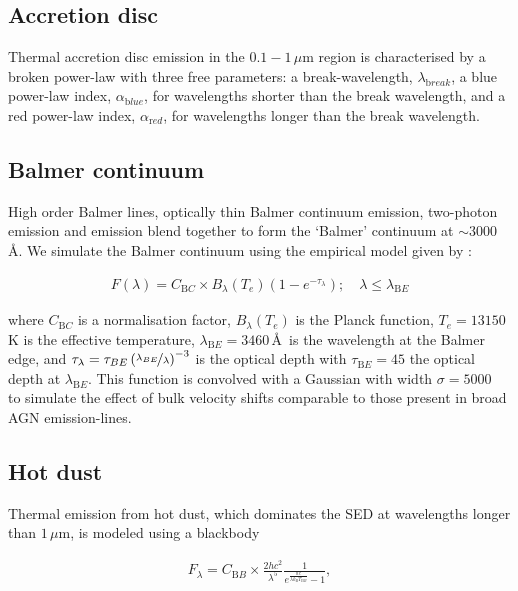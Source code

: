\subsection{Accretion disc}

Thermal accretion disc emission in the $0.1 - 1$\,$\mu$m region is characterised by a broken power-law with three free parameters: a break-wavelength, $\lambda_{\mathrm break}$, a blue power-law index, $\alpha_{\mathrm blue}$, for wavelengths shorter than the break wavelength, and a red power-law index, $\alpha_{\mathrm red}$, for wavelengths longer than the break wavelength.

\subsection{Balmer continuum}

High order Balmer lines, optically thin Balmer continuum emission, two-photon emission and  emission blend together to form the `Balmer' continuum at $\sim3000$\,\AA.
We simulate the Balmer continuum using the empirical model given by \citet{grandi82}: 

\begin{eqnarray}
  F(\lambda) = C_{\mathrm BC} \times B_\lambda(T_e)(1-e^{-\tau_\lambda}); \quad \lambda \leq \lambda_{\mathrm BE}
\end{eqnarray}

where $C_{\mathrm BC}$ is a normalisation factor, $B_\lambda(T_e)$ is the Planck function, $T_e=13150$\,K is the effective temperature, $\lambda_{\mathrm BE}=3460$\,\AA\, is the wavelength at the Balmer edge, and $\tau_\lambda = \tau_{BE}\left( \nicefrac{\lambda_{BE}} {\lambda} \right)^{-3}$ is the optical depth with $\tau_{\mathrm BE}=45$ the optical depth at $\lambda_{\mathrm BE}$. 
This function is convolved with a Gaussian with width $\sigma=5000$\,\kms\, to simulate the effect of bulk velocity shifts comparable to those present in broad AGN emission-lines. 

\subsection{Hot dust}

Thermal emission from hot dust, which dominates the SED at wavelengths longer than $1$\,$\mu$m, is modeled using a blackbody

\begin{eqnarray}  
  F_\lambda = C_{\mathrm BB} \times \frac{2 hc^2}{\lambda^5}\frac{1}{ e^{\frac{hc}{\lambda k_\mathrm{B}T_{\mathrm BB}}} - 1}, 
\end{eqnarray}


